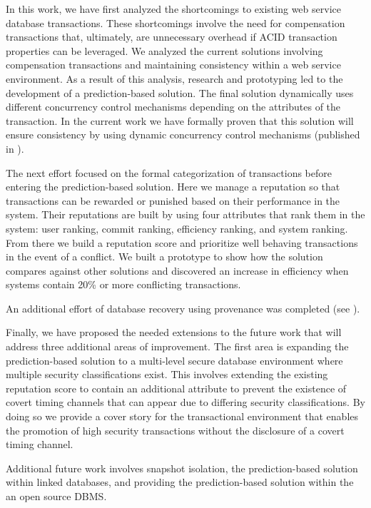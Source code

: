 In this work, we have first analyzed the shortcomings to existing web service database transactions. These shortcomings involve the need for compensation transactions that, ultimately, are unnecessary overhead if \ac{ACID} transaction properties can be leveraged. We analyzed the current solutions involving compensation transactions and maintaining consistency within a web service environment. As a result of this analysis, research and prototyping led to the development of a prediction-based solution. The final solution dynamically uses different concurrency control mechanisms depending on the attributes of the transaction. In the current work we have formally proven that this solution will ensure consistency by using dynamic concurrency control mechanisms (published in \cite{ravan_ensuring_2020}).

The next effort focused on the formal categorization of transactions before entering the prediction-based solution. Here we manage a reputation so that transactions can be rewarded or punished based on their performance in the system. Their reputations are built by using four attributes that rank them in the system: user ranking, commit ranking, efficiency ranking, and system ranking. From there we build a reputation score and prioritize well behaving transactions in the event of a conflict. We built a prototype to show how the solution compares against other solutions and discovered an increase in efficiency when systems contain 20\% or more conflicting transactions.

An additional effort of database recovery using provenance was completed (see \cite{theppatorn_2021}). 

Finally, we have proposed the needed extensions to the future work that will address three additional areas of improvement. The first area is expanding the prediction-based solution to a multi-level secure database environment where multiple security classifications exist. This involves extending the existing reputation score to contain an additional attribute to prevent the existence of covert timing channels that can appear due to differing security classifications. By doing so we provide a cover story for the transactional environment that enables the promotion of high security transactions without the disclosure of a covert timing channel.

Additional future work involves snapshot isolation, the prediction-based solution within linked databases, and providing the prediction-based solution within the an open source DBMS.

